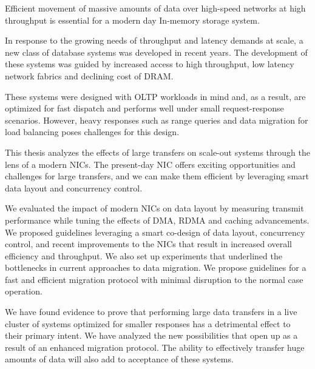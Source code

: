 

Efficient movement of massive amounts of data over high-speed networks at high 
throughput is essential for a modern day In-memory storage system.

In response to the growing needs of throughput and latency demands at scale, a new class of database systems was developed in recent years. The development of these systems was guided by increased access to high throughput, low latency network fabrics and declining cost of DRAM.

These systems were designed with OLTP workloads in mind and, as a result, are optimized for fast dispatch and performs well under small
request-response scenarios. However, heavy responses such as range queries and data migration for load balancing poses challenges for this design.  

This thesis analyzes the effects of large transfers on scale-out systems
through the lens of a modern NICs. The present-day NIC offers exciting opportunities and challenges for large transfers, and we can make them efficient by leveraging smart data layout and concurrency control.

We evaluated the impact of modern NICs on data layout by measuring transmit performance while tuning the effects of DMA, RDMA and caching advancements. We proposed guidelines
leveraging a smart co-design of data layout, concurrency control, and recent improvements to the NICs that result in increased overall efficiency and throughput. We also set up experiments that underlined the bottlenecks in current approaches to data migration. We propose guidelines for a fast and efficient migration protocol with minimal disruption to the normal case operation.

We have found evidence to prove that performing large data transfers in a live cluster of systems optimized for smaller responses has a detrimental effect to their primary intent. 
We have analyzed the new possibilities that open up as a result of an enhanced migration protocol. The ability to effectively transfer huge amounts of data will also add to acceptance of these systems.
